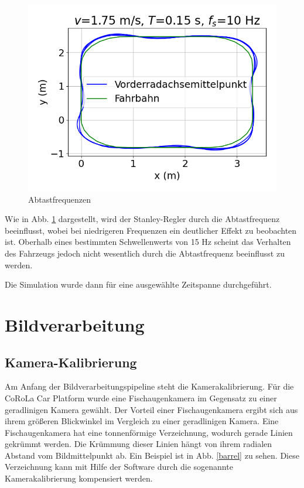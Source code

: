 \documentclass[arbeit=studie,oneside,BCOR=12mm]{ArbeitRST}
\begin{document}
\begin{figure}[h]
    \includegraphics[scale=0.47]{10Hz}
    \caption{Abtastfrequenzen}
    \label{sampling}
\end{figure}

Wie in Abb. \ref{sampling} dargestellt, wird der Stanley-Regler durch die Abtastfrequenz
beeinflusst, wobei bei niedrigeren Frequenzen ein deutlicher Effekt zu
beobachten ist. Oberhalb eines bestimmten Schwellenwerts von 15 Hz scheint das
Verhalten des Fahrzeugs jedoch nicht wesentlich durch die Abtastfrequenz
beeinflusst zu werden. 

Die Simulation wurde dann für eine ausgewählte Zeitspanne durchgeführt. 



\chapter{Bildverarbeitung}
\section{Kamera-Kalibrierung}

Am Anfang der Bildverarbeitungspipeline steht die Kamerakalibrierung. Für die
CoRoLa Car Platform wurde eine Fischaugenkamera im Gegensatz zu einer
geradlinigen Kamera gewählt. Der Vorteil einer Fischaugenkamera ergibt sich aus
ihrem größeren Blickwinkel im Vergleich zu einer geradlinigen Kamera. Eine
Fischaugenkamera hat eine tonnenförmige Verzeichnung,
wodurch gerade Linien gekrümmt werden. Die Krümmung dieser Linien hängt von
ihrem radialen Abstand vom Bildmittelpunkt ab. Ein Beispiel ist in Abb.
\ref{barrel} zu sehen. Diese Verzeichnung kann mit Hilfe der Software durch die
sogenannte Kamerakalibrierung kompensiert werden. \\
\end{document}
